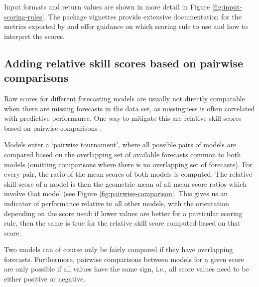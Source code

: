 \documentclass[
]{jss}
\begin{document}
Input formats and return values are shown in more detail in Figure
\ref{fig:input-scoring-rules}. The package vignettes provide extensive
documentation for the metrics exported by  and offer
guidance on which scoring rule to use and how to interpret the scores.

\subsection{Adding relative skill scores based on pairwise
comparisons}\label{pairwisetheory}

Raw scores for different forecasting models are usually not directly
comparable when there are missing forecasts in the data set, as
missingness is often correlated with predictive performance. One way to
mitigate this are relative skill scores based on pairwise comparisons
\citep{cramerEvaluationIndividualEnsemble2021}.

Models enter a `pairwise tournament', where all possible pairs of models
are compared based on the overlapping set of available forecasts common
to both models (omitting comparisons where there is no overlapping set
of forecasts). For every pair, the ratio of the mean scores of both
models is computed. The relative skill score of a model is then the
geometric mean of all mean score ratios which involve that model (see
Figure \ref{fig:pairwise-comparison}. This gives us an indicator of
performance relative to all other models, with the orientation depending
on the score used: if lower values are better for a particular scoring
rule, then the same is true for the relative skill score computed based
on that score.

Two models can of course only be fairly compared if they have
overlapping forecasts. Furthermore, pairwise comparisons between models
for a given score are only possible if all values have the same sign,
i.e., all score values need to be either positive or negative.
\end{document}
